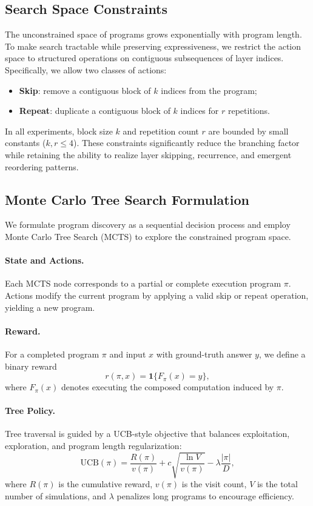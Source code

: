 \documentclass{article}
\theoremstyle{plain}
\theoremstyle{definition}
\theoremstyle{remark}
\begin{document}
\subsection{Search Space Constraints}

The unconstrained space of programs grows exponentially with program length.
To make search tractable while preserving expressiveness,
we restrict the action space to structured operations on contiguous subsequences
of layer indices.
Specifically, we allow two classes of actions:
\begin{itemize}[leftmargin=*,topsep=2pt,itemsep=2pt]
    \item \textbf{Skip}: remove a contiguous block of $k$ indices from the program;
    \item \textbf{Repeat}: duplicate a contiguous block of $k$ indices for $r$ repetitions.
\end{itemize}
In all experiments, block size $k$ and repetition count $r$ are bounded by small constants
($k,r \leq 4$).
These constraints significantly reduce the branching factor
while retaining the ability to realize layer skipping, recurrence,
and emergent reordering patterns.

\subsection{Monte Carlo Tree Search Formulation}

We formulate program discovery as a sequential decision process
and employ Monte Carlo Tree Search (MCTS) to explore the constrained program space.

\paragraph{State and Actions.}
Each MCTS node corresponds to a partial or complete execution program $\pi$.
Actions modify the current program by applying a valid skip or repeat operation,
yielding a new program.

\paragraph{Reward.}
For a completed program $\pi$ and input $x$ with ground-truth answer $y$,
we define a binary reward
\[
r(\pi, x) = \mathbf{1}\{F_{\pi}(x) = y\},
\]
where $F_{\pi}(x)$ denotes executing the composed computation induced by $\pi$.

\paragraph{Tree Policy.}
Tree traversal is guided by a UCB-style objective
that balances exploitation, exploration, and program length regularization:
\[
\mathrm{UCB}(\pi)
= \frac{R(\pi)}{v(\pi)}
+ c \sqrt{\frac{\ln V}{v(\pi)}}
- \lambda \frac{|\pi|}{D},
\]
where $R(\pi)$ is the cumulative reward,
$v(\pi)$ is the visit count,
$V$ is the total number of simulations,
and $\lambda$ penalizes long programs to encourage efficiency.
\end{document}
